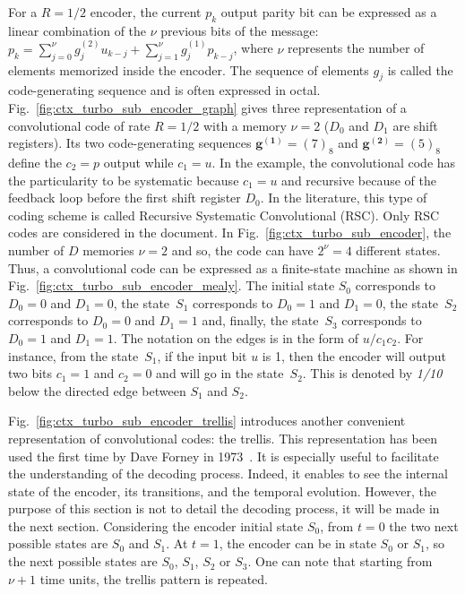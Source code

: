 For a $R=1/2$ encoder, the current $p_k$ output parity bit can be expressed as a
linear combination of the $\nu$ previous bits of the message:
$p_k = \sum_{j=0}^\nu g^{(2)}_{j} u_{k-j} + \sum_{j=1}^\nu g^{(1)}_{j} p_{k-j}$,
where $\nu$ represents the number of elements memorized inside the encoder.
The sequence of elements $g_j$ is called the code-generating sequence and is
often expressed in octal. Fig.~\ref{fig:ctx_turbo_sub_encoder_graph} gives three
representation of a convolutional code of rate $R = 1/2$ with a memory $\nu = 2$
($D_0$ and $D_1$ are shift registers). Its two code-generating sequences
$\bm{g^{(1)}} = (7)_8$ and $\bm{g^{(2)}} = (5)_8$ define the $c_2 = p$ output
while $c_1 = u$. In the example, the convolutional code has the particularity to
be systematic because $c_1 = u$ and recursive because of the feedback loop
before the first shift register $D_0$. In the literature, this type of coding
scheme is called Recursive Systematic Convolutional (RSC). Only RSC codes are
considered in the document. In Fig.~\ref{fig:ctx_turbo_sub_encoder}, the number
of $D$ memories $\nu = 2$ and so, the code can have $2^\nu = 4$ different
states. Thus, a convolutional code can be expressed as a finite-state machine as
shown in Fig.~\ref{fig:ctx_turbo_sub_encoder_mealy}. The initial state $S_0$
corresponds to $D_0 = 0$ and $D_1 = 0$, the state~$S_1$ corresponds to $D_0 = 1$
and $D_1 = 0$, the state~$S_2$ corresponds to $D_0 = 0$ and $D_1 = 1$ and,
finally, the state~$S_3$ corresponds to $D_0 = 1$ and $D_1 = 1$. The notation on
the edges is in the form of $u/c_1c_2$. For instance, from the state~$S_1$, if
the input bit $u$ is 1, then the encoder will output two bits $c_1 = 1$ and
$c_2 = 0$ and will go in the state~$S_2$. This is denoted by \emph{1/10} below
the directed edge between $S_1$ and $S_2$.

Fig.~\ref{fig:ctx_turbo_sub_encoder_trellis} introduces another convenient
representation of convolutional codes: the trellis. This representation has
been used the first time by Dave Forney in 1973~\cite{Forney1973}. It is
especially useful to facilitate the understanding of the decoding process.
Indeed, it enables to see the internal state of the encoder, its transitions,
and the temporal evolution. However, the purpose of this section is not to
detail the decoding process, it will be made in the next section. Considering
the encoder initial state $S_0$, from $t = 0$ the two next possible states are
$S_0$ and $S_1$. At $t = 1$, the encoder can be in state $S_0$ or $S_1$, so the
next possible states are $S_0$, $S_1$, $S_2$ or $S_3$. One can note that
starting from $\nu +1$ time units, the trellis pattern is repeated.

